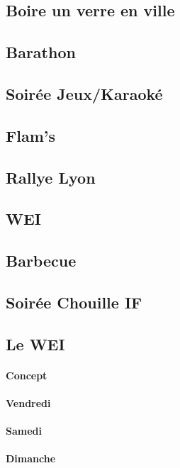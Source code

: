 \begin{multicols}{2}
    \subsection{Boire un verre en ville}
    
    \subsection{Barathon}
    
    \subsection{Soirée Jeux/Karaoké}
    
    \subsection{Flam's}
    
    \subsection{Rallye Lyon}
    
    \subsection{WEI}
    
    \subsection{Barbecue}
    
    \subsection{Soirée Chouille IF }
    
    \subsection{Le WEI}
	\paragraph{Concept}
	
	\paragraph{Vendredi}
	
	\paragraph{Samedi}
	
	\paragraph{Dimanche} 
	

\end{multicols}
